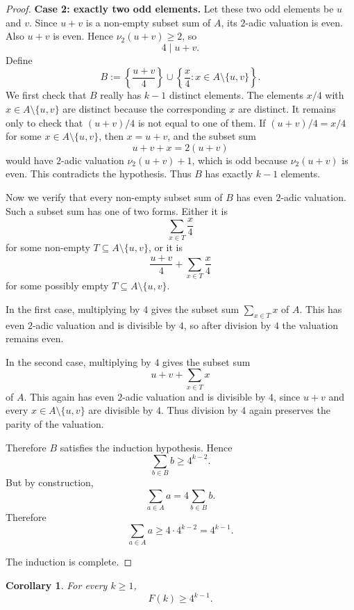 \documentclass[11pt]{article}
\newtheorem{corollary}[theorem]{Corollary}
\begin{document}
\begin{proof}
\medskip
\noindent\textbf{Case 2: exactly two odd elements.}
Let these two odd elements be $u$ and $v$. Since $u+v$ is a non-empty subset sum of $A$, its $2$-adic valuation is even. Also $u+v$ is even. Hence $\nu_2(u+v)\geq 2$, so
\[
    4\mid u+v.
\]
Define
\[
    B:=\left\{\frac{u+v}{4}\right\}
       \cup
       \left\{\frac{x}{4}:x\in A\setminus\{u,v\}\right\}.
\]
We first check that $B$ really has $k-1$ distinct elements. The elements $x/4$ with $x\in A\setminus\{u,v\}$ are distinct because the corresponding $x$ are distinct. It remains only to check that $(u+v)/4$ is not equal to one of them. If $(u+v)/4=x/4$ for some $x\in A\setminus\{u,v\}$, then $x=u+v$, and the subset sum
\[
    u+v+x=2(u+v)
\]
would have $2$-adic valuation $\nu_2(u+v)+1$, which is odd because $\nu_2(u+v)$ is even. This contradicts the hypothesis. Thus $B$ has exactly $k-1$ elements.

Now we verify that every non-empty subset sum of $B$ has even $2$-adic valuation. Such a subset sum has one of two forms. Either it is
\[
    \sum_{x\in T}\frac{x}{4}
\]
for some non-empty $T\subseteq A\setminus\{u,v\}$, or it is
\[
    \frac{u+v}{4}+\sum_{x\in T}\frac{x}{4}
\]
for some possibly empty $T\subseteq A\setminus\{u,v\}$.

In the first case, multiplying by $4$ gives the subset sum $\sum_{x\in T}x$ of $A$. This has even $2$-adic valuation and is divisible by $4$, so after division by $4$ the valuation remains even.

In the second case, multiplying by $4$ gives the subset sum
\[
    u+v+\sum_{x\in T}x
\]
of $A$. This again has even $2$-adic valuation and is divisible by $4$, since $u+v$ and every $x\in A\setminus\{u,v\}$ are divisible by $4$. Thus division by $4$ again preserves the parity of the valuation.

Therefore $B$ satisfies the induction hypothesis. Hence
\[
    \sum_{b\in B}b\geq 4^{k-2}.
\]
But by construction,
\[
    \sum_{a\in A}a=4\sum_{b\in B}b.
\]
Therefore
\[
    \sum_{a\in A}a\geq 4\cdot 4^{k-2}=4^{k-1}.
\]

The induction is complete.
\end{proof}

\begin{corollary}\label{cor:lower}
For every $k\geq 1$,
\[
    F(k)\geq 4^{k-1}.
\]
\end{corollary}
\end{document}
